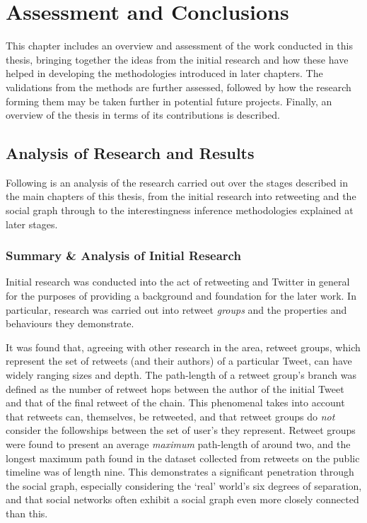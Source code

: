 \chapter{Assessment and Conclusions}
This chapter includes an overview and assessment of the work conducted in this thesis, bringing together the ideas from the initial research and how these have helped in developing the methodologies introduced in later chapters. The validations from the methods are further assessed, followed by how the research forming them may be taken further in potential future projects. Finally, an overview of the thesis in terms of its contributions is described.


\section{Analysis of Research and Results}
Following is an analysis of the research carried out over the stages described in the main chapters of this thesis, from the initial research into retweeting and the social graph through to the interestingness inference methodologies explained at later stages.

\subsection{Summary \& Analysis of Initial Research}
Initial research was conducted into the act of retweeting and Twitter in general for the purposes of providing a background and foundation for the later work. In particular, research was carried out into retweet \textit{groups} and the properties and behaviours they demonstrate.

It was found that, agreeing with other research in the area, retweet groups, which represent the set of retweets (and their authors) of a particular Tweet, can have widely ranging sizes and depth. The path-length of a retweet group's branch was defined as the number of retweet hops between the author of the initial Tweet and that of the final retweet of the chain. This phenomenal takes into account that retweets can, themselves, be retweeted, and that retweet groups do \textit{not} consider the followships between the set of user's they represent. Retweet groups were found to present an average \textit{maximum} path-length of around two, and the longest maximum path found in the dataset collected from retweets on the public timeline was of length nine. This demonstrates a significant penetration through the social graph, especially considering the `real' world's six degrees of separation, and that social networks often exhibit a social graph even more closely connected than this.

